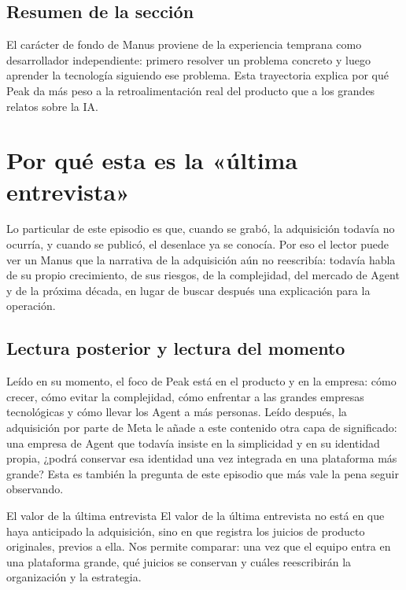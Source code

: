 \documentclass[a4paper]{article}
\begin{document}
\subsection{Resumen de la sección}

El carácter de fondo de Manus proviene de la experiencia temprana como desarrollador independiente: primero resolver un problema concreto y luego aprender la tecnología siguiendo ese problema. Esta trayectoria explica por qué Peak da más peso a la retroalimentación real del producto que a los grandes relatos sobre la IA.
\section{Por qué esta es la «última entrevista»}

Lo particular de este episodio es que, cuando se grabó, la adquisición todavía no ocurría, y cuando se publicó, el desenlace ya se conocía. Por eso el lector puede ver un Manus que la narrativa de la adquisición aún no reescribía: todavía habla de su propio crecimiento, de sus riesgos, de la complejidad, del mercado de Agent y de la próxima década, en lugar de buscar después una explicación para la operación.

\subsection{Lectura posterior y lectura del momento}

Leído en su momento, el foco de Peak está en el producto y en la empresa: cómo crecer, cómo evitar la complejidad, cómo enfrentar a las grandes empresas tecnológicas y cómo llevar los Agent a más personas. Leído después, la adquisición por parte de Meta le añade a este contenido otra capa de significado: una empresa de Agent que todavía insiste en la simplicidad y en su identidad propia, ¿podrá conservar esa identidad una vez integrada en una plataforma más grande? Esta es también la pregunta de este episodio que más vale la pena seguir observando.

\begin{knowledgebox}{El valor de la última entrevista}
El valor de la última entrevista no está en que haya anticipado la adquisición, sino en que registra los juicios de producto originales, previos a ella. Nos permite comparar: una vez que el equipo entra en una plataforma grande, qué juicios se conservan y cuáles reescribirán la organización y la estrategia.
\end{knowledgebox}
\end{document}
